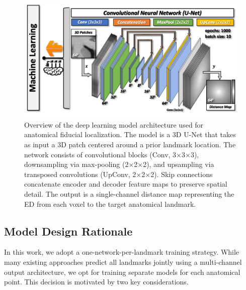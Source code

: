 \begin{figure}[hbt!]
    \centering
    \includegraphics[width=1\linewidth]{figs/ch3_Figure_cnn.png}
    \caption{Overview of the deep learning model architecture used for anatomical fiducial localization. The model is a 3D U-Net that takes as input a 3D patch centered around a prior landmark location. The network consists of convolutional blocks (Conv, 3×3×3), downsampling via max-pooling (2×2×2), and upsampling via transposed convolutions (UpConv, 2×2×2). Skip connections concatenate encoder and decoder feature maps to preserve spatial detail. The output is a single-channel distance map representing the ED from each voxel to the target anatomical landmark.}
    \label{fig:ch3_Figure_cnn}
\end{figure}


\subsection{Model Design Rationale}
In this work, we adopt a one-network-per-landmark training strategy. While many existing approaches predict all landmarks jointly using a multi-channel output architecture, we opt for training separate models for each anatomical point. This decision is motivated by two key considerations.

